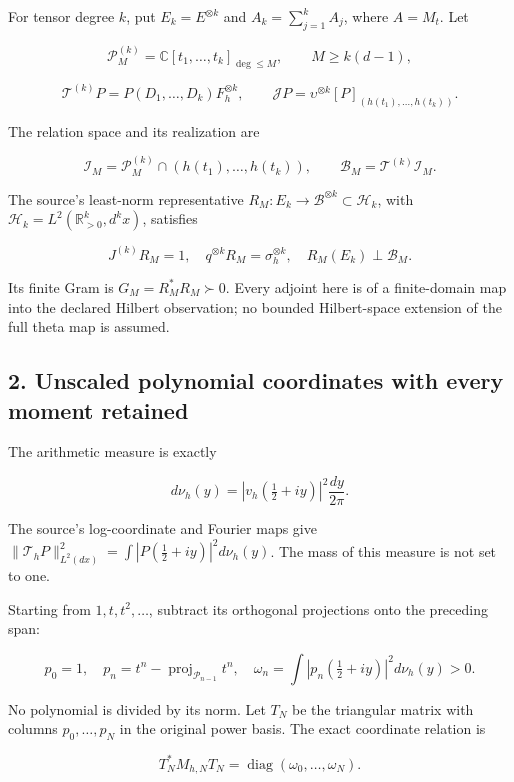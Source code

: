 \documentclass[
]{article}
\begin{document}
For tensor degree \(k\), put \(E_k=E^{\otimes k}\) and
\(A_k=\sum_{j=1}^k A_j\), where \(A=M_t\). Let

\[\mathcal P_M^{(k)}=\mathbb C[t_1,\ldots,t_k]_{\deg\le M},\qquad M\ge k(d-1),\]

\[\mathcal T^{(k)}P=P(D_1,\ldots,D_k)F_h^{\otimes k},\qquad
\mathcal J P=\upsilon^{\otimes k}[P]_{(h(t_1),\ldots,h(t_k))}.\tag{1.4}\]

The relation space and its realization are

\[\mathcal I_M=\mathcal P_M^{(k)}\cap(h(t_1),\ldots,h(t_k)),\qquad
\mathcal B_M=\mathcal T^{(k)}\mathcal I_M.\tag{1.5}\]

The source's least-norm representative
\(R_M:E_k\to\mathscr B^{\otimes k}\subset\mathcal H_k\), with
\(\mathcal H_k=L^2(\mathbb R_{>0}^k,d^kx)\), satisfies

\[J^{(k)}R_M=1,\quad q^{\otimes k}R_M=\sigma_h^{\otimes k},\quad
R_M(E_k)\perp\mathcal B_M.\tag{1.6}\]

Its finite Gram is \(G_M=R_M^*R_M\succ0\). Every adjoint here is of a
finite-domain map into the declared Hilbert observation; no bounded
Hilbert-space extension of the full theta map is assumed.

\subsection{2. Unscaled polynomial coordinates with every moment
retained}\label{unscaled-polynomial-coordinates-with-every-moment-retained}

The arithmetic measure is exactly

\[d\nu_h(y)=|v_h(\tfrac12+iy)|^2\frac{dy}{2\pi}.\tag{2.1}\]

The source's log-coordinate and Fourier maps give
\(\|\mathcal T_hP\|_{L^2(dx)}^2=\int|P(\tfrac12+iy)|^2d\nu_h(y)\). The
mass of this measure is not set to one.

Starting from \(1,t,t^2,\ldots\), subtract its orthogonal projections
onto the preceding span:

\[p_0=1,\quad p_n=t^n-\operatorname{proj}_{\mathcal P_{n-1}}t^n,\quad
\omega_n=\int|p_n(\tfrac12+iy)|^2d\nu_h(y)>0.\tag{2.2}\]

No polynomial is divided by its norm. Let \(T_N\) be the triangular
matrix with columns \(p_0,\ldots,p_N\) in the original power basis. The
exact coordinate relation is

\[T_N^*M_{h,N}T_N=\operatorname{diag}(\omega_0,\ldots,\omega_N).\tag{2.3}\]
\end{document}
